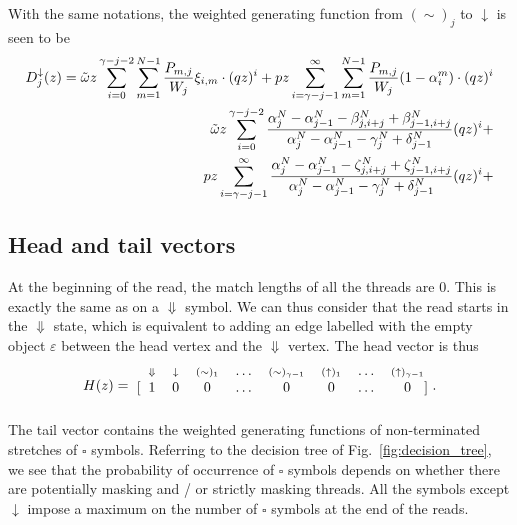 \documentclass{article}
\newcommand{\DN}{\scriptstyle{\Downarrow}}
\newcommand{\dn}{\scriptstyle{\downarrow}}
\newcommand{\up}[1]{\scriptstyle{(\uparrow)_{#1}}}
\newcommand{\eq}[1]{\scriptstyle{(\sim)_{#1}}}
\begin{document}
With the same notations, the weighted generating function from $(\sim)_j$
to $\downarrow$ is seen to be 
\begin{eqnarray}
D^\downarrow_j(z) = \tilde{\omega} z
  \sum_{i=0}^{\gamma-j-2} \sum_{m=1}^{N-1}
  \frac{P_{m,j}}{W_j} \xi_{i,m} \cdot (qz)^i +
  pz \sum_{i=\gamma-j-1}^\infty \sum_{m=1}^{N-1}
  \frac{P_{m,j}}{W_j} (1-\alpha_i^m) \cdot (qz)^i \notag \\
\tilde{\omega} z \sum_{i=0}^{\gamma-j-2}
\frac{ \alpha_j^N-\alpha_{j-1}^N-\beta_{j,i+j}^N
  +\beta_{j-1,i+j}^N }
{\alpha_j^N-\alpha_{j-1}^N-\gamma_j^N+\delta_{j-1}^N} (qz)^i + \notag \\
pz \sum_{i=\gamma-j-1}^\infty
\frac{ \alpha_j^N-\alpha_{j-1}^N-\zeta_{j,i+j}^N
  +\zeta_{j-1,i+j}^N }
{\alpha_j^N-\alpha_{j-1}^N-\gamma_j^N+\delta_{j-1}^N} (qz)^i + \notag \\
\end{eqnarray}

\subsection{Head and tail vectors}

At the beginning of the read, the match lengths of all the threads are
$0$. This is exactly the same as on a $\Downarrow$ symbol. We can thus
consider that the read starts in the $\Downarrow$ state, which is
equivalent to adding an edge labelled with the empty object $\varepsilon$
between the head vertex and the $\Downarrow$ vertex. The head vector is
thus
\begin{equation*}
H(z) = 
\begin{blockarray}{cccccccc}
   \;\; \DN & \dn &\eq{1} & \ldots & \eq{\gamma-1} &
    \up{1} & \ldots & \up{\gamma-1} \\
\begin{block}{[cccccccc]}
\;\; 1 & 0 & 0 & \ldots & 0 & 0 & \ldots & 0 \\
\end{block}
\end{blockarray}.
\end{equation*}
The tail vector contains the weighted generating functions of
non-terminated stretches of $\square$ symbols. Referring to the decision
tree of Fig.~\ref{fig:decision_tree}, we see that the probability of
occurrence of $\square$ symbols depends on whether there are potentially
masking and / or strictly masking threads. All the symbols except
$\downarrow$ impose a maximum on the number of $\square$ symbols at the
end of the reads.
\end{document}
